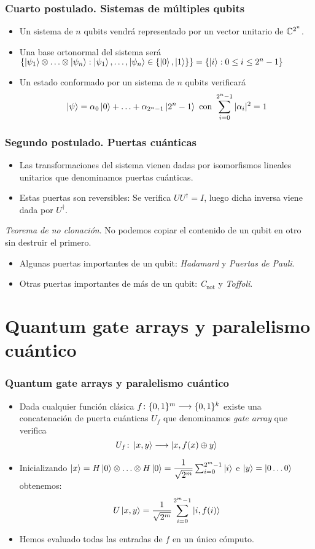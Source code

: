 \documentclass{beamer}
\begin{document}
\begin{frame}
	\frametitle{Cuarto postulado. Sistemas de múltiples qubits}
	
	\begin{itemize}
	\item Un sistema de $n$ qubits vendrá representado por un vector unitario de $\mathbb{C}^{2^n}$.
	\item Una base ortonormal del sistema será $\{\left|\psi_1\right\rangle\otimes\hdots\otimes\left|\psi_n\right\rangle:\left|\psi_1\right\rangle,\hdots,\left|\psi_n\right\rangle\in\{\left|0\right\rangle,\left|1\right\rangle\}\}=\{\left|i\right\rangle: 0\leq i\leq 2^n-1\}$
	\item Un estado conformado por un sistema de $n$ qubits verificará
	$$\left|\psi\right\rangle=\alpha_0\left|0\right\rangle+\hdots+\alpha_{2^n-1}\left|2^n-1\right\rangle\textrm{ con }\sum_{i=0}^{2^n-1}|\alpha_i|^2=1$$
	
	\end{itemize}
\end{frame}

\begin{frame}
	\frametitle{Segundo postulado. Puertas cuánticas}
	\begin{itemize}
 	\item Las transformaciones del sistema vienen dadas por isomorfismos lineales unitarios que denominamos puertas cuánticas.
 	\item Estas puertas son reversibles: Se verifica $UU^\dag=I$, luego dicha inversa viene dada por $U^\dag$.
	\end{itemize}
	\begin{thm} \emph{Teorema de no clonación}. No podemos copiar el contenido de un qubit en otro sin destruir el primero.
	\end{thm}
	\begin{itemize}
 	\item Algunas puertas importantes de un qubit: \emph{Hadamard} y \emph{Puertas de Pauli}.
 	\item Otras puertas importantes de más de un qubit: \emph{C$_\mathrm{not}$ } y \emph{Toffoli}.
	\end{itemize}
\end{frame}
\section{Quantum gate arrays y paralelismo cuántico}

\begin{frame}
	\frametitle{Quantum gate arrays y paralelismo cuántico}
	\begin{itemize}
 	\item Dada cualquier función clásica $f\colon \{0,1\}^m\longrightarrow \{0,1\}^k$ existe una concatenación de puerta cuánticas $U_f$ que denominamos \emph{gate array} que verifica
 	$$U_f\colon \left|x,y\right\rangle\longrightarrow \left|x,f(x)\oplus y\right\rangle$$
 	\item Inicializando $\left|x\right\rangle=H\left|0\right\rangle\otimes\hdots\otimes H\left|0\right\rangle=\dfrac{1}{\sqrt{2^m}}\sum_{i=0}^{2^m-1}\left|i\right\rangle$ e $\left|y\right\rangle=\left|0\hdots0\right\rangle$ obtenemos:
 	$$U\left|x,y\right\rangle=\dfrac{1}{\sqrt{2^m}}\sum_{i=0}^{2^m-1}\left|i,f(i)\right\rangle$$
 	\item Hemos evaluado todas las entradas de $f$ en un único cómputo.
	\end{itemize}
\end{frame}
\end{document}
